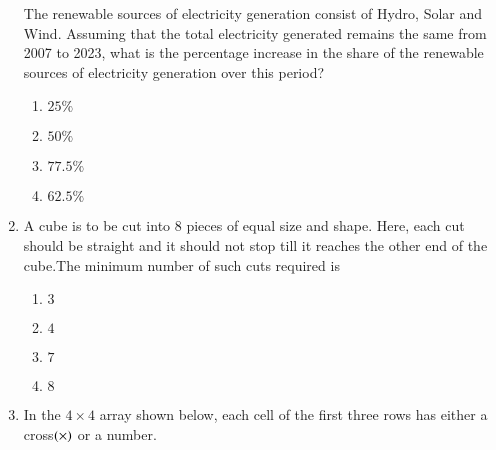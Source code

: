 \documentclass[journal]{IEEEtran}
\begin{document}
\begin{enumerate}
{\begin{figure}[H]
\label{fig:my_label}
\end{figure}
The renewable sources of electricity generation consist of Hydro, Solar and Wind. Assuming that the total electricity generated remains the same from 2007 to 2023, what is the percentage increase in the share of the renewable sources of electricity generation over this period?
\begin{multicols}{4}
\begin{enumerate}
\item $25\%$
\item $50\%$
\item $77.5\%$
\item $62.5\%$
\end{enumerate}
\end{multicols}
}
\item{
A cube is to be cut into $8$ pieces of equal size and shape. Here, each cut should be straight and it should not stop till it reaches the other end of the cube.The minimum number of such cuts required is
\begin{multicols}{4}
\begin{enumerate}
\item $3$
\item $4$
\item $7$ 
\item $8$
\end{enumerate}
\end{multicols}
}
\item{
In the $4\times 4$ array shown below, each cell of the first three rows has either a cross$\left(\times\right)$ or a number.
\begin{figure}[H]
\centering
{}%


\end{figure}}
\end{enumerate}
\end{document}
